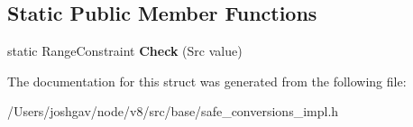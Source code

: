\subsection*{Static Public Member Functions}
\begin{DoxyCompactItemize}
\item 
static Range\+Constraint {\bfseries Check} (Src value)\hypertarget{structv8_1_1base_1_1internal_1_1_dst_range_relation_to_src_range_impl_3_01_dst_00_01_01_01_01_01ab2f39c7ea8dfb0ed9715e7bb61ddec3_af452ef7abbdf4d37a85c551ac774bd85}{}\label{structv8_1_1base_1_1internal_1_1_dst_range_relation_to_src_range_impl_3_01_dst_00_01_01_01_01_01ab2f39c7ea8dfb0ed9715e7bb61ddec3_af452ef7abbdf4d37a85c551ac774bd85}

\end{DoxyCompactItemize}


The documentation for this struct was generated from the following file\+:\begin{DoxyCompactItemize}
\item 
/\+Users/joshgav/node/v8/src/base/safe\+\_\+conversions\+\_\+impl.\+h\end{DoxyCompactItemize}

